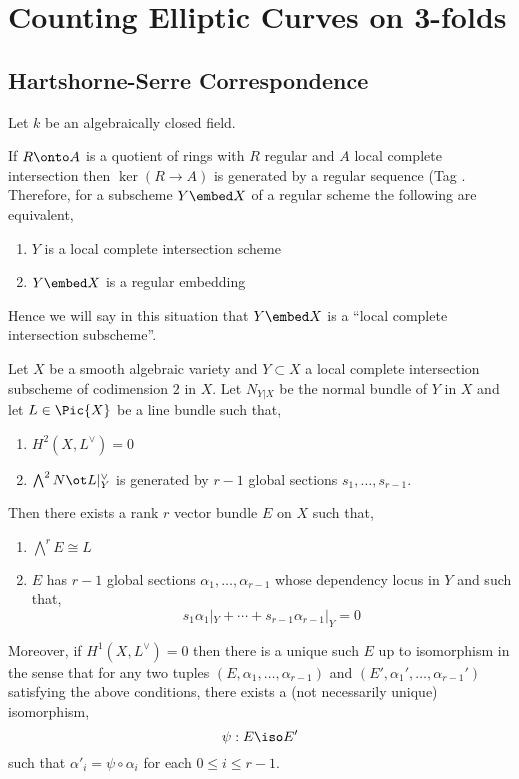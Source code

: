 \documentclass[12pt]{article}
\begin{document}
\section{Counting Elliptic Curves on 3-folds}

\subsection{Hartshorne-Serre Correspondence}

Let $k$ be an algebraically closed field.

\begin{rmk}
If $R \onto A$ is a quotient of rings with $R$ regular and $A$ local complete intersection then $\ker{(R \to A)}$ is generated by a regular sequence (Tag . Therefore, for a subscheme $Y \embed X$ of a regular scheme the following are equivalent,
\begin{enumerate}
\item $Y$ is a local complete intersection scheme
\item $Y \embed X$ is a regular embedding
\end{enumerate} 
Hence we will say in this situation that $Y \embed X$ is a ``local complete intersection subscheme''.
\end{rmk}

\begin{theorem}
Let $X$ be a smooth algebraic variety and $Y \subset X$ a local complete intersection subscheme of codimension $2$ in $X$. Let $N_{Y|X}$ be the normal bundle of $Y$ in $X$ and let $L \in \Pic{X}$ be a line bundle such that,
\begin{enumerate}
\item $H^2(X, L^\vee) = 0$
\item $\bigwedge^2 N \ot L|_Y^{\vee}$ is generated by $r-1$ global sections $s_1, \dots, s_{r-1}$.
\end{enumerate}
Then there exists a rank $r$ vector bundle $E$ on $X$ such that,
\begin{enumerate}
\item $\bigwedge^r E \cong L$
\item $E$ has $r-1$ global sections $\alpha_1, \dots, \alpha_{r-1}$ whose dependency locus in $Y$ and such that,
\[ s_1 \alpha_1 |_Y + \cdots + s_{r-1} \alpha_{r-1} |_Y = 0 \]
\end{enumerate}
Moreover, if $H^1(X, L^\vee) = 0$ then there is a unique such $E$ up to isomorphism in the sense that for any two tuples $(E, \alpha_1, \dots, \alpha_{r-1})$ and $(E', \alpha_1', \dots, \alpha_{r-1}')$ satisfying the above conditions, there exists a (not necessarily unique) isomorphism,
\[ \psi : E \iso E' \]
such that $\alpha'_i = \psi \circ \alpha_i$ for each $0 \le i \le r-1$.
\end{theorem}
\end{document}
